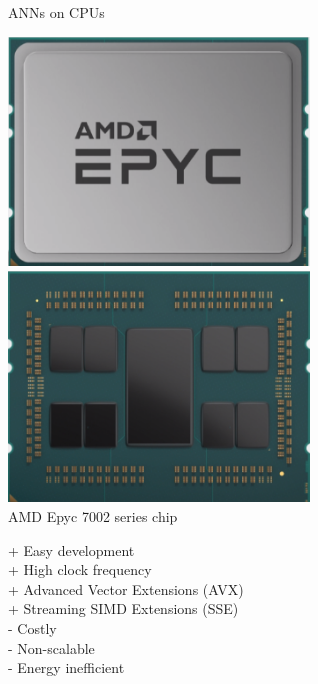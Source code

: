 \begin{frame}{ANNs on CPUs}
	\begin{minipage}{0.4\textwidth}
		\centering
		\includegraphics[width=0.6\textwidth]{../Images/Hardware/amd-epyc.png}\\
		\includegraphics[width=0.6\textwidth]{../Images/Hardware/amd-epyc-dies.png}\\
		AMD Epyc 7002 series chip
	\end{minipage}%
	\begin{minipage}{0.6\textwidth}
		+ Easy development\\
		+ High clock frequency\\
		+ Advanced Vector Extensions (AVX)\\
		+ Streaming SIMD Extensions (SSE)\\
		- Costly\\
		- Non-scalable\\
		- Energy inefficient
	\end{minipage}
\end{frame}


